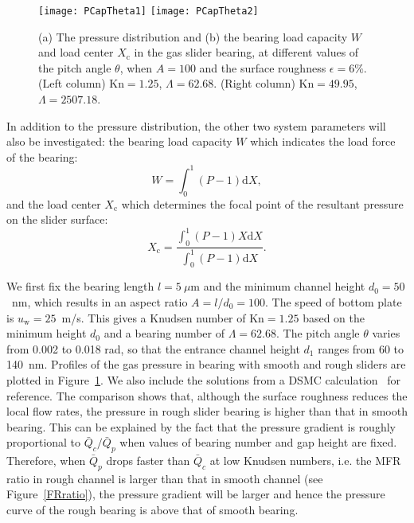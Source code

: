 \begin{figure}[t]
	\centering
	\texttt{[image: PCapTheta1]}
	\hskip 0.5cm
	\texttt{[image: PCapTheta2]}
	\caption{ (a) The pressure distribution and (b) the bearing load capacity $W$ and load center $X_\text{c}$ in the gas slider bearing, at different values of the pitch angle $\theta$, when $A=100$ and the surface roughness $\epsilon=6\%$. (Left column) $\text{Kn}=1.25$, $\Lambda=62.68$.  (Right column) $\text{Kn}=49.95$, $\Lambda=2507.18$.}
	\label{pTheta1}
\end{figure}

In addition to the pressure distribution, the other two system parameters will also be investigated: the bearing load capacity $W$ which indicates the load force of the bearing:
\begin{equation}
W=\int_0^1(P-1)\mathrm{d}X,
\end{equation}
and the load center $X_\text{c}$ which determines the focal point of the resultant pressure on the slider surface:
\begin{equation}
X_\text{c}=\frac{\int_0^1(P-1)X\mathrm{d}X}{\int_0^1(P-1)\mathrm{d}X}.
\end{equation}






We first fix the bearing length $l=5\ \mu$m and the minimum channel height $d_0=50$~nm, which results in an aspect ratio $A=l/d_0=100$. The speed of bottom plate is $u_\text{w}=25$~m/s. This gives a Knudsen number of $\text{Kn}=1.25$ based on the minimum height $d_0$ and a bearing number of $\Lambda=62.68$. The pitch angle $\theta$ varies from 0.002 to 0.018 rad, so that the entrance channel height $d_1$ ranges from 60 to 140~nm. Profiles of the gas pressure in bearing with smooth and rough sliders are plotted in Figure~\ref{pTheta1}. We also include the solutions from a DSMC calculation~\cite{Liu2001} for reference. The comparison shows that, although the surface roughness reduces the local flow rates, the pressure in rough slider bearing is higher than that in smooth bearing. This can be explained by the fact that the pressure gradient is roughly proportional to $\bar{Q}_c/\bar{Q}_p$ when values of bearing number and gap height are fixed.
Therefore, when $\bar{Q}_p$ drops faster than $\bar{Q}_c$ at low Knudsen numbers, i.e. the MFR ratio in rough channel is larger than that in smooth channel (see Figure~\ref{FRratio}), the pressure gradient will be larger and hence the pressure curve of the rough bearing is above that of smooth bearing.


